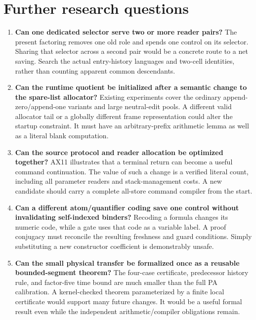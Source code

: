 \documentclass[11pt]{article}
\begin{document}
\section{Further research questions}
\begin{enumerate}[leftmargin=*]
\item \textbf{Can one dedicated selector serve two or more reader pairs?}
The present factoring removes one old role and spends one control on its
selector. Sharing that selector across a second pair would be a concrete
route to a net saving. Search the actual entry-history languages and
two-cell identities, rather than counting apparent common descendants.

\item \textbf{Can the runtime quotient be initialized after a semantic
change to the spare-list allocator?} Existing experiments cover the
ordinary append-zero/append-one variants and large neutral-edit pools. A
different valid allocator tail or a globally different frame representation
could alter the startup constraint. It must have an arbitrary-prefix
arithmetic lemma as well as a literal blank computation.

\item \textbf{Can the source protocol and reader allocation be optimized
together?} AX11 illustrates that a terminal return can become a useful
command continuation. The value of such a change is a verified literal
count, including all parameter readers and stack-management costs. A new
candidate should carry a complete all-store command compiler from the start.

\item \textbf{Can a different atom/quantifier coding save one control
without invalidating self-indexed binders?} Recoding a formula changes its
numeric code, while a gate uses that code as a variable label. A proof
conjugacy must reconcile the resulting freshness and guard conditions.
Simply substituting a new constructor coefficient is demonstrably unsafe.

\item \textbf{Can the small physical transfer be formalized once as a
reusable bounded-segment theorem?} The four-case certificate, predecessor
history rule, and factor-five time bound are much smaller than the full
PA calibration. A kernel-checked theorem parameterized by a finite local
certificate would support many future changes. It would be a useful formal
result even while the independent arithmetic/compiler obligations remain.
\end{enumerate}
\end{document}
